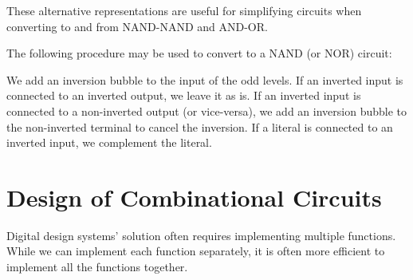 \documentclass{report}
\begin{document}
These alternative representations are useful for simplifying circuits when converting to and from NAND-NAND and AND-OR.

The following procedure may be used to convert to a NAND (or NOR) circuit:

\begin{enumerate}
	\ii We add an inversion bubble to the input of the odd levels.
	\ii If an inverted input is connected to an inverted output, we leave it as is.
	\ii If an inverted input is connected to a non-inverted output (or vice-versa), we add an inversion bubble to the non-inverted terminal to cancel the inversion.
	\ii If a literal is connected to an inverted input, we complement the literal.
\end{enumerate}

\section{Design of Combinational Circuits}

Digital design systems' solution often requires implementing multiple functions. While we can implement each function separately, it is often more efficient to implement all the functions together.\\
\end{document}
